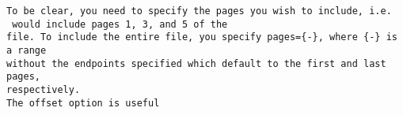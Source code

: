 \documentclass{article}
\begin{document}
\begin{verbatim}
To be clear, you need to specify the pages you wish to include, i.e. 
 would include pages 1, 3, and 5 of the 
file. To include the entire file, you specify pages={-}, where {-} is a range 
without the endpoints specified which default to the first and last pages, 
respectively. 
The offset option is useful 
\end{verbatim}

\end{document}
